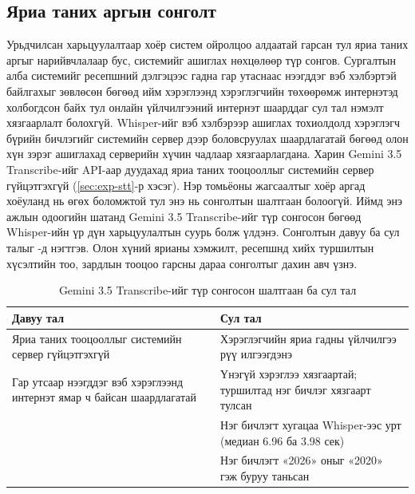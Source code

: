 \subsection{Яриа таних аргын сонголт}
\label{sec:res-interpretation}
\label{sec:stt-choice}

Урьдчилсан харьцуулалтаар хоёр систем ойролцоо алдаатай гарсан тул яриа таних аргыг нарийвчлалаар бус, системийг ашиглах нөхцөлөөр түр сонгов. Сургалтын алба системийг ресепшний дэлгэцээс гадна гар утаснаас нээгддэг вэб хэлбэртэй байлгахыг зөвлөсөн бөгөөд ийм хэрэглээнд хэрэглэгчийн төхөөрөмж интернэтэд холбогдсон байх тул онлайн үйлчилгээний интернэт шаарддаг сул тал нэмэлт хязгаарлалт болохгүй. Whisper-ийг вэб хэлбэрээр ашиглах тохиолдолд хэрэглэгч бүрийн бичлэгийг системийн сервер дээр боловсруулах шаардлагатай бөгөөд олон хүн зэрэг ашиглахад серверийн хүчин чадлаар хязгаарлагдана. Харин Gemini 3.5 Transcribe-ийг API-аар дуудахад яриа таних тооцооллыг системийн сервер гүйцэтгэхгүй (\ref{sec:exp-stt}-р хэсэг). Нэр томьёоны жагсаалтыг хоёр аргад хоёуланд нь өгөх боломжтой тул энэ нь сонголтын шалтгаан болоогүй. Иймд энэ ажлын одоогийн шатанд Gemini 3.5 Transcribe-ийг түр сонгосон бөгөөд Whisper-ийн үр дүн харьцуулалтын суурь болж үлдэнэ. Сонголтын давуу ба сул талыг -д нэгтгэв. Олон хүний ярианы хэмжилт, ресепшнд хийх туршилтын хүсэлтийн тоо, зардлын тооцоо гарсны дараа сонголтыг дахин авч үзнэ.

\begin{table}[htbp]
\centering
\caption{Gemini 3.5 Transcribe-ийг түр сонгосон шалтгаан ба сул тал}
\label{tab:stt_tradeoffs}
\begin{tabular}{|p{6.7cm}|p{6.7cm}|}
\hline
\textbf{Давуу тал} & \textbf{Сул тал} \\
\hline
Яриа таних тооцооллыг системийн сервер гүйцэтгэхгүй & Хэрэглэгчийн яриа гадны үйлчилгээ рүү илгээгдэнэ \\
\hline
Гар утсаар нээгддэг вэб хэрэглээнд интернэт ямар ч байсан шаардлагатай & Үнэгүй хэрэглээ хязгаартай; туршилтад нэг бичлэг хязгаарт тулсан \\
\hline
 & Нэг бичлэгт хугацаа Whisper-ээс урт (медиан 6.96 ба 3.98 сек) \\
\hline
 & Нэг бичлэгт «2026» оныг «2020» гэж буруу таньсан \\
\hline
\end{tabular}
\end{table}


